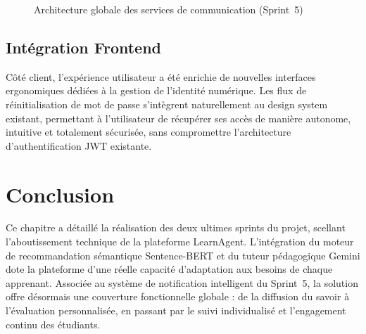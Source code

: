 \documentclass[12pt,a4paper]{report}
\begin{document}
\begin{figure}[H]
\centering
{}
\caption{Architecture globale des services de communication (Sprint~5)}
\end{figure}

\subsection{Intégration Frontend}

Côté client, l'expérience utilisateur a été enrichie de nouvelles interfaces ergonomiques dédiées à la gestion de l'identité numérique. Les flux de réinitialisation de mot de passe s'intègrent naturellement au design system existant, permettant à l'utilisateur de récupérer ses accès de manière autonome, intuitive et totalement sécurisée, sans compromettre l'architecture d'authentification JWT existante.

\section*{Conclusion}

Ce chapitre a détaillé la réalisation des deux ultimes sprints du projet, scellant l'aboutissement technique de la plateforme LearnAgent. L'intégration du moteur de recommandation sémantique Sentence-BERT et du tuteur pédagogique Gemini dote la plateforme d'une réelle capacité d'adaptation aux besoins de chaque apprenant. Associée au système de notification intelligent du Sprint~5, la solution offre désormais une couverture fonctionnelle globale : de la diffusion du savoir à l'évaluation personnalisée, en passant par le suivi individualisé et l'engagement continu des étudiants.
\end{document}
